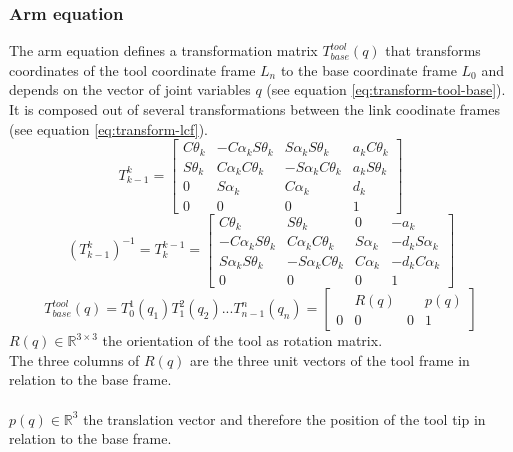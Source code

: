 \documentclass[12pt]{article}
\newcommand{\R}{\mathbb{R}}
\begin{document}
	\subsubsection{Arm equation}
	The arm equation defines a transformation matrix $T^{tool}_{base}(q)$ that transforms coordinates of the tool coordinate frame $L_n$ to the base coordinate frame $L_0$ and depends on the vector of joint variables $q$ (see equation \ref{eq:transform-tool-base}). It is composed out of several transformations between the link coodinate frames (see equation \ref{eq:transform-lcf}).
	\begin{equation}
	T^{k}_{k-1} = 
	\begin{bmatrix}
	C \theta_k & -C \alpha_k S \theta_k & S \alpha_k S \theta_k & a_k C \theta_k\\
	S \theta_k & C \alpha_k C \theta_k & -S \alpha_k C \theta_k & a_k S \theta_k\\
	0 & S \alpha_k & C \alpha_k & d_k\\
	0 & 0 & 0 & 1
	\end{bmatrix}
	\label{eq:transform-lcf}
	\end{equation}
	\begin{equation}
	(T^{k}_{k-1})^{-1} = T^{k-1}_{k} = 
	\begin{bmatrix}
	C \theta_k & S \theta_k & 0 & -a_k\\
	-C \alpha_k S \theta_k & C \alpha_k C \theta_k & S \alpha_k & -d_k S \alpha_k\\
	S \alpha_k S \theta_k & -S \alpha_k C \theta_k & C \alpha_k & -d_k C \alpha_k\\
	0 & 0 & 0 & 1
	\end{bmatrix}
	\end{equation}
	\begin{equation}
	T^{tool}_{base}(q) = T^1_0(q_1) T^2_1(q_2) ... T^n_{n-1}(q_n) = 
	\begin{bmatrix}
	& R(q) & & p(q)\\
	0 & 0 & 0 & 1
	\end{bmatrix}
	\label{eq:transform-tool-base}
	\end{equation}
	$R(q) \in \R^{3 \times 3}$ the orientation of the tool as rotation matrix.\\
	The three columns of $R(q)$ are the three unit vectors of the tool frame in relation to the base frame.\\
	\\
	$p(q) \in \R^3$ the translation vector and therefore the position of the tool tip in relation to the base frame.
	
\end{document}

